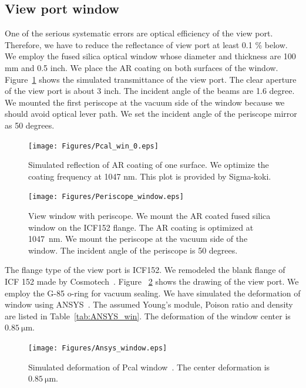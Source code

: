 \subsection{View port window}
One of the serious systematic errors are optical efficiency of the view port. Therefore, we have to reduce the reflectance of  view port at least 0.1 \% below. We employ the fused silica optical window whose diameter and thickness are 100 mm and 0.5 inch. We place the AR coating on both surfaces of the window. Figure~\ref{fig:Pcal_win_0} shows the simulated transmittance of the view port. The clear aperture of the view port is about 3 inch. The incident angle of the beams are 1.6 degree. We mounted the first periscope at the vacuum side of the window because we should avoid optical lever path. We set the incident angle of the periscope mirror as 50 degrees.

\begin{figure}
\begin{center}
\texttt{[image: Figures/Pcal\_win\_0.eps]}
\caption{Simulated reflection of AR coating of one surface. We optimize the coating frequency at 1047 nm. This plot is provided by Sigma-koki.} 
\label{fig:Pcal_win_0} 
\end{center}
\end{figure}

\begin{figure}
\begin{center}
\texttt{[image: Figures/Periscope\_window.eps]}
\caption{View window with periscope. We mount the AR coated fused silica window on  the ICF152 flange. The AR coating is optimized at 1047~nm. We mount the periscope at the vacuum side of the window. The incident angle of the periscope is 50 degrees.} 
\label{fig:Pcal_window} 
\end{center}
\end{figure}

The flange type of the view port is ICF152. We remodeled the blank flange of ICF 152 made by Cosmotech~\cite{Cosmotech}. Figure ~\ref{fig:Pcal_window} shows the drawing of the view port. We employ the G-85 o-ring for vacuum sealing. 
We have simulated the deformation of window using ANSYS~\cite{ANSYS}. The assumed Young's module, Poison ratio and density are listed in Table~\ref{tab:ANSYS_win}. The deformation of the window center is $0.85~\mathrm{\mu m}$.

\begin{figure}
\begin{center}
\texttt{[image: Figures/Ansys\_window.eps]}
\caption{Simulated deformation of Pcal window~\cite{ANSYS}. The center deformation is $0.85~\mathrm{\mu m}$.} 
\label{fig:Ansys_window} 
\end{center}
\end{figure}

